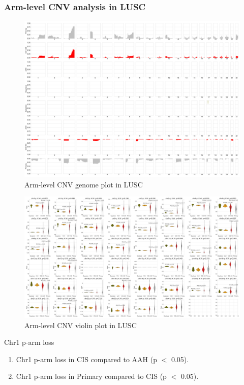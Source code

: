 \documentclass{beamer}
\begin{document}
            \begin{frame}[allowframebreaks]
                \frametitle{Arm-level CNV analysis in LUSC}

                \begin{figure}
                    \includegraphics[width=0.7 \linewidth]{figures/Sequenza/BWA-simple-SQC.pdf}
                    \caption{Arm-level CNV genome plot in LUSC}
                \end{figure}

                \begin{figure}
                    \includegraphics[width=0.8 \linewidth]{figures/Sequenza/BWA-violin-SQC.pdf}
                    \caption{Arm-level CNV violin plot in LUSC}
                \end{figure}

                \begin{block}{Chr1 p-arm loss}
                    \begin{enumerate}
                        \item Chr1 p-arm loss in CIS compared to AAH (p $<$ 0.05).
                        \item Chr1 p-arm loss in Primary compared to CIS (p $<$ 0.05).
                    \end{enumerate}


\end{block}
\end{frame}
\end{document}
